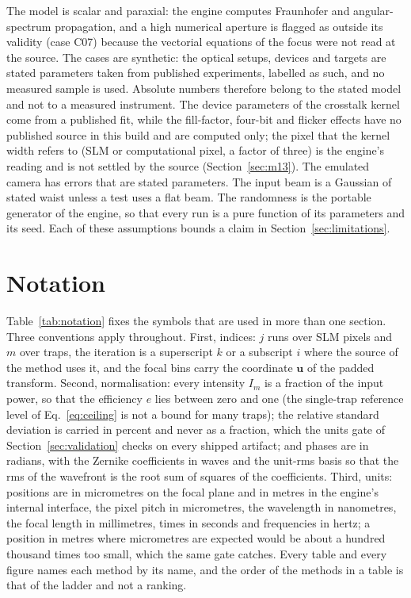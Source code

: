 The model is scalar and paraxial: the engine computes Fraunhofer and angular-spectrum propagation, and a high numerical aperture is flagged as outside its validity (case C07) because the vectorial equations of the focus were not read at the source. The cases are synthetic: the optical setups, devices and targets are stated parameters taken from published experiments, labelled as such, and no measured sample is used. Absolute numbers therefore belong to the stated model and not to a measured instrument. The device parameters of the crosstalk kernel come from a published fit, while the fill-factor, four-bit and flicker effects have no published source in this build and are computed only; the pixel that the kernel width refers to (SLM or computational pixel, a factor of three) is the engine's reading and is not settled by the source (Section~\ref{sec:m13}). The emulated camera has errors that are stated parameters. The input beam is a Gaussian of stated waist unless a test uses a flat beam. The randomness is the portable generator of the engine, so that every run is a pure function of its parameters and its seed. Each of these assumptions bounds a claim in Section~\ref{sec:limitations}.

\section{Notation}\label{sec:notation}



Table~\ref{tab:notation} fixes the symbols that are used in more than one section. Three conventions apply throughout. First, indices: $j$ runs over SLM pixels and $m$ over traps, the iteration is a superscript $k$ or a subscript $i$ where the source of the method uses it, and the focal bins carry the coordinate $\mathbf u$ of the padded transform. Second, normalisation: every intensity $I_m$ is a fraction of the input power, so that the efficiency $e$ lies between zero and one (the single-trap reference level of Eq.~\eqref{eq:ceiling} is not a bound for many traps); the relative standard deviation is carried in percent and never as a fraction, which the units gate of Section~\ref{sec:validation} checks on every shipped artifact; and phases are in radians, with the Zernike coefficients in waves and the unit-rms basis so that the rms of the wavefront is the root sum of squares of the coefficients. Third, units: positions are in micrometres on the focal plane and in metres in the engine's internal interface, the pixel pitch in micrometres, the wavelength in nanometres, the focal length in millimetres, times in seconds and frequencies in hertz; a position in metres where micrometres are expected would be about a hundred thousand times too small, which the same gate catches. Every table and every figure names each method by its name, and the order of the methods in a table is that of the ladder and not a ranking.

